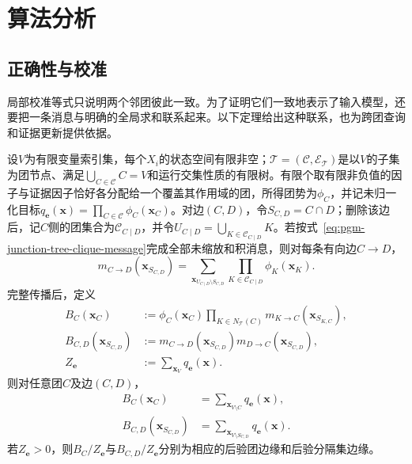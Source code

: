 \section{算法分析}
\label{sec:pgm-junction-tree-analysis}

\subsection{正确性与校准}
\label{sec:pgm-junction-tree-correctness}

局部校准等式只说明两个邻团彼此一致。为了证明它们一致地表示了输入模型，还要把一条消息与明确的全局求和联系起来。以下定理给出这种联系，也为跨团查询和证据更新提供依据。

\begin{theorem}[子树消息与团边缘]
  \label{thm:pgm-junction-tree-correctness}
  设$V$为有限变量索引集，每个$X_i$的状态空间有限非空；$\mathcal{T}=(\mathcal{C},\mathcal{E}_{\mathcal T})$是以$V$的子集为团节点、满足$\bigcup_{C\in\mathcal C}C=V$和运行交集性质的有限树。有限个取有限非负值的因子与证据因子恰好各分配给一个覆盖其作用域的团，所得团势为$\phi_C$，并记未归一化目标$q_{\bm e}(\bm{x})=\prod_{C\in\mathcal C}\phi_C(\bm{x}_C)$。对边$(C,D)$，令$S_{C,D}=C\cap D$；删除该边后，记$C$侧的团集合为$\mathcal{C}_{C\mid D}$，并令$U_{C\mid D}=\bigcup_{K\in\mathcal{C}_{C\mid D}}K$。若按式~\eqref{eq:pgm-junction-tree-clique-message}完成全部未缩放和积消息，则对每条有向边$C\to D$，
  \begin{equation}
    m_{C\to D}(\bm{x}_{S_{C,D}})
      =\sum_{\bm{x}_{U_{C\mid D}\setminus S_{C,D}}}
         \prod_{K\in\mathcal{C}_{C\mid D}}\phi_K(\bm{x}_K).
    \label{eq:pgm-junction-tree-subtree-invariant}
  \end{equation}
  完整传播后，定义
  \[
    \begin{aligned}
      B_C(\bm{x}_C)&\mathrel{:=}
        \phi_C(\bm{x}_C)
        \prod_{K\in N_{\mathcal{T}}(C)}
          m_{K\to C}(\bm{x}_{S_{K,C}}),\\
      B_{C,D}(\bm{x}_{S_{C,D}})&\mathrel{:=}
        m_{C\to D}(\bm{x}_{S_{C,D}})
        m_{D\to C}(\bm{x}_{S_{C,D}}),\\
      Z_{\bm e}&\mathrel{:=}
        \sum_{\bm{x}_V}q_{\bm e}(\bm{x}).
    \end{aligned}
  \]
  则对任意团$C$及边$(C,D)$，
  \begin{equation}
    \begin{aligned}
      B_C(\bm{x}_C)
        &=\sum_{\bm{x}_{V\setminus C}}q_{\bm{e}}(\bm{x}),\\
      B_{C,D}(\bm{x}_{S_{C,D}})
        &=\sum_{\bm{x}_{V\setminus S_{C,D}}}q_{\bm{e}}(\bm{x}).
    \end{aligned}
    \label{eq:pgm-junction-tree-true-marginals}
  \end{equation}
  若$Z_{\bm e}>0$，则$B_C/Z_{\bm e}$与$B_{C,D}/Z_{\bm e}$分别为相应的后验团边缘和后验分隔集边缘。
\end{theorem}

